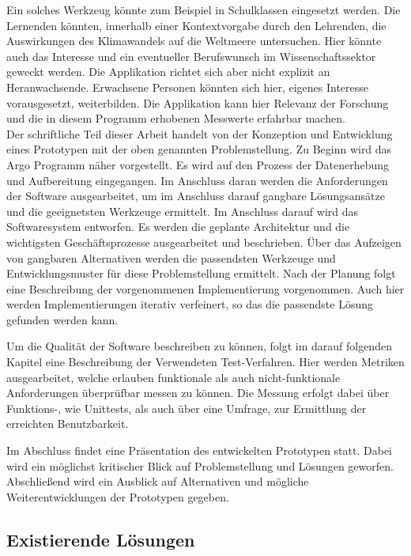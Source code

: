     
    Ein solches Werkzeug könnte zum Beispiel in Schulklassen eingesetzt werden. 
    Die Lernenden könnten, innerhalb einer Kontextvorgabe durch den Lehrenden, die Auswirkungen des Klimawandels auf die Weltmeere untersuchen.
    Hier könnte auch das Interesse und ein eventueller Berufswunsch im Wissenschaftssektor geweckt werden.
    Die Applikation richtet sich aber nicht explizit an Heranwachsende. Erwachsene Personen könnten sich hier, eigenes Interesse vorausgesetzt, weiterbilden. Die Applikation kann hier Relevanz der Forschung und die in diesem Programm erhobenen Messwerte erfahrbar machen. \\
    
    
    Der schriftliche Teil dieser Arbeit handelt von der Konzeption und Entwicklung eines Prototypen mit der oben genannten Problemstellung. Zu Beginn wird das Argo Programm näher vorgestellt. Es wird auf den Prozess der Datenerhebung und Aufbereitung eingegangen. Im Anschluss daran werden die Anforderungen der Software ausgearbeitet, um im Anschluss darauf gangbare Lösungsansätze und die geeignetsten Werkzeuge ermittelt.
    Im Anschluss darauf wird das Softwaresystem entworfen. Es werden die geplante Architektur und die wichtigsten Geschäftsprozesse ausgearbeitet und beschrieben. Über das 
    Aufzeigen von gangbaren Alternativen werden die passendsten Werkzeuge und Entwicklungsmuster für diese Problemstellung ermittelt.
    Nach der Planung folgt eine Beschreibung der vorgenommenen Implementierung vorgenommen. Auch hier werden Implementierungen iterativ verfeinert, so das die passendste Lösung gefunden werden kann.

    Um die Qualität der Software beschreiben zu können, folgt im darauf folgenden Kapitel eine Beschreibung der Verwendeten Test-Verfahren. Hier werden Metriken ausgearbeitet, welche erlauben funktionale als auch nicht-funktionale Anforderungen überprüfbar messen zu können. Die Messung erfolgt dabei über Funktions-, wie Unittests, als auch über eine Umfrage, zur Ermittlung der erreichten Benutzbarkeit. 
    
    Im Abschluss findet eine Präsentation des entwickelten Prototypen statt. Dabei wird ein möglichst kritischer Blick auf Problemstellung und Lösungen geworfen. Abschließend wird ein Ausblick auf Alternativen und mögliche Weiterentwicklungen der Prototypen gegeben.
    
    
    
\subsection{Existierende Lösungen}
  
